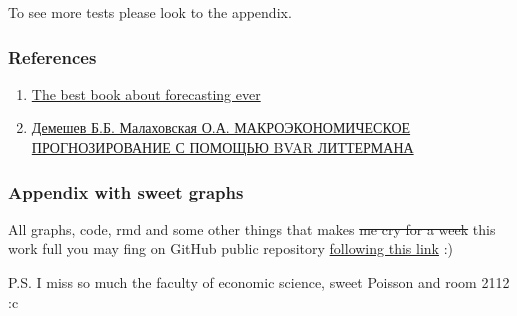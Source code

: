 \documentclass[
]{article}
\providecommand{\tightlist}{%
  \setlength{\itemsep}{0pt}\setlength{\parskip}{0pt}}
\begin{document}
To see more tests please look to the appendix.

\hypertarget{references}{%
\subsubsection{References}\label{references}}

\begin{enumerate}
\def\labelenumi{\arabic{enumi}.}
\tightlist
\item
  \href{https://otexts.com/fpp3/x11.html}{The best book about
  forecasting ever}
\item
  \href{https://cyberleninka.ru/article/n/makroekonomicheskoe-prognozirovanie-s-pomoschyu-bvar-littermana/viewer}{Демешев
  Б.Б. Малаховская О.А. МАКРОЭКОНОМИЧЕСКОЕ ПРОГНОЗИРОВАНИЕ С ПОМОЩЬЮ
  BVAR ЛИТТЕРМАНА}
\end{enumerate}

\hypertarget{appendix-with-sweet-graphs}{%
\subsubsection{Appendix with sweet
graphs}\label{appendix-with-sweet-graphs}}

All graphs, code, rmd and some other things that makes \sout{me cry for
a week} this work full you may fing on GitHub public repository
\href{https://github.com/Galunay/bank_inst_has/tree/master/metrics}{following
this link} :)

P.S. I miss so much the faculty of economic science, sweet Poisson and
room 2112 :c
\end{document}
